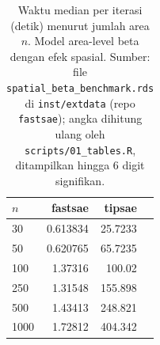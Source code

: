 \begin{table}[htbp]
\centering
\caption{Waktu median per iterasi (detik) menurut jumlah area $n$. Model area-level beta dengan efek spasial. Sumber: file \texttt{spatial\_beta\_benchmark.rds} di \texttt{inst/extdata} (repo \texttt{fastsae}); angka dihitung ulang oleh \texttt{scripts/01\_tables.R}, ditampilkan hingga 6 digit signifikan.}
\label{tab:time-sbeta}
\small
\begin{tabular}{lrrr}
\toprule
$n$ & fastsae & tipsae \\
\midrule
30 & 0.613834 & 25.7233 \\
50 & 0.620765 & 65.7235 \\
100 & 1.37316 &  100.02 \\
250 & 1.31548 & 155.898 \\
500 & 1.43413 & 248.821 \\
1000 & 1.72812 & 404.342 \\
\bottomrule
\end{tabular}
\end{table}


